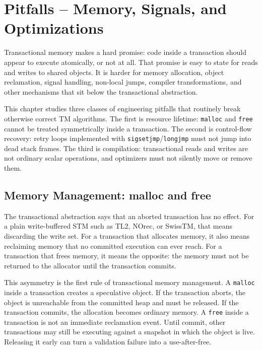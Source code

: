 \chapter{Pitfalls – Memory, Signals, and Optimizations}

Transactional memory makes a hard promise: code inside a transaction should appear to execute atomically, or not at all.  That promise is easy to state for reads and writes to shared objects.  It is harder for memory allocation, object reclamation, signal handling, non-local jumps, compiler transformations, and other mechanisms that sit below the transactional abstraction.

This chapter studies three classes of engineering pitfalls that routinely break otherwise correct TM algorithms.  The first is resource lifetime: \texttt{malloc} and \texttt{free} cannot be treated symmetrically inside a transaction.  The second is control-flow recovery: retry loops implemented with \texttt{sigsetjmp}/\texttt{longjmp} must not jump into dead stack frames.  The third is compilation: transactional reads and writes are not ordinary scalar operations, and optimizers must not silently move or remove them.

\section{Memory Management: malloc and free}

The transactional abstraction says that an aborted transaction has no effect.  For a plain write-buffered STM such as TL2, NOrec, or SwissTM, that means discarding the write set.  For a transaction that allocates memory, it also means reclaiming memory that no committed execution can ever reach.  For a transaction that frees memory, it means the opposite: the memory must not be returned to the allocator until the transaction commits.

This asymmetry is the first rule of transactional memory management.  A \texttt{malloc} inside a transaction creates a speculative object.  If the transaction aborts, the object is unreachable from the committed heap and must be released.  If the transaction commits, the allocation becomes ordinary memory.  A \texttt{free} inside a transaction is not an immediate reclamation event.  Until commit, other transactions may still be executing against a snapshot in which the object is live.  Releasing it early can turn a validation failure into a use-after-free.


